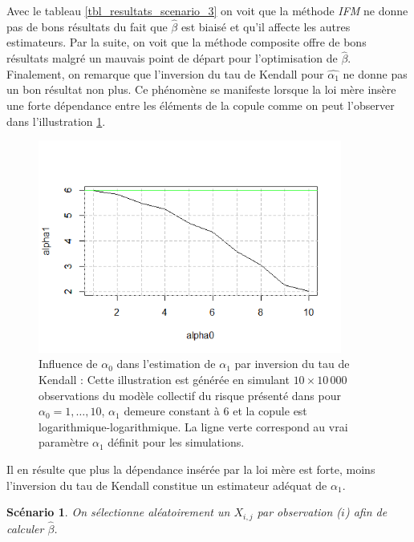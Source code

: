 \documentclass[11pt]{article}
\newtheorem{scenario}{Scénario}
\begin{document}
 		Avec le tableau \ref{tbl_resultats_scenario_3} on voit que la méthode \textit{IFM} ne donne pas de bons résultats du fait que $\hat{\beta}$ est biaisé et qu'il affecte les autres estimateurs. Par la suite, on voit que la méthode composite offre de bons résultats malgré un mauvais point de départ pour l'optimisation de $\hat{\beta}$. Finalement, on remarque que l'inversion du tau de Kendall pour $\hat{\alpha_1}$ ne donne pas un bon résultat non plus. Ce phénomène se manifeste lorsque la loi mère insère une forte dépendance entre les éléments de la copule comme on peut l'observer dans l'illustration \ref{graph_alpha1_fct_de_alpha0}.
 		
 		\begin{figure}[H]
 			\centering
 			\includegraphics[height=7cm]{graph/alpha1_fct_de_alpha0.png}
 			\caption[Influence de $\alpha_{0}$ dans l'estimation de $\alpha_1$ par inversion du tau de Kendall]{Influence de $\alpha_{0}$ dans l'estimation de $\alpha_1$ par inversion du tau de Kendall : 
 			Cette illustration est générée en simulant $10 \times 10\,000$ observations du modèle collectif du risque présenté dans \cite{Itre5} pour $\alpha_{0} = 1,\dots, 10$, $\alpha_{1}$ demeure constant à $6$ et la copule est logarithmique-logarithmique. La ligne verte correspond au vrai paramètre $\alpha_1$ définit pour les simulations.}
 		\label{graph_alpha1_fct_de_alpha0}
 		\end{figure}
 	
 		Il en résulte que plus la dépendance insérée par la loi mère est forte, moins l'inversion du tau de Kendall constitue un estimateur adéquat de $\alpha_1$.
 		
 		
 		\begin{scenario}\label{scenario_selection_aleatoire_Xij}
 			On sélectionne aléatoirement un $X_{i,j}$ par observation ($i$) afin de calculer $\hat{\beta}$.
 		\end{scenario}
 	
\end{document}
